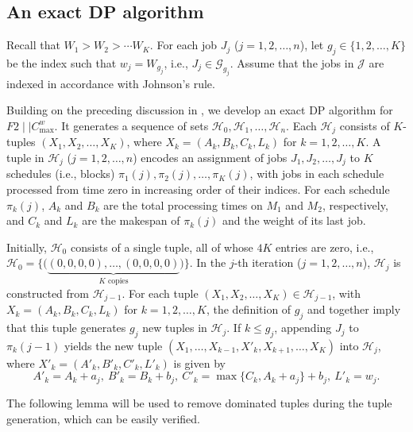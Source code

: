 \documentclass[12pt]{article} \textheight=24.5cm \textwidth=16.5cm \parskip = 0.165cm
\begin{document}
\begin{sloppypar}
        \subsection{An exact DP algorithm} \label{sec:dp}
        
        Recall that $W_1 >W_2 > \cdots W_K$.
        For each job $J_j$ ($j=1, 2, \ldots, n$), let $g_j \in \{1, 2, \ldots, K\}$ be the index such that $w_j=W_{g_j}$, i.e., $J_j\in\mathcal{G}_{g_j}$.
        Assume that the jobs in $\mathcal{J}$ are indexed in accordance with Johnson's rule.
        
        Building on the preceding discussion in , we develop an exact DP algorithm for $F2 \mid \mid C_{\max}^w$.
        It generates a sequence of sets $\mathcal{H}_0, \mathcal{H}_1, \ldots, \mathcal{H}_n$.
        Each $\mathcal{H}_j$ consists of $K$-tuples $(X_1, X_2, \ldots, X_K)$, where $X_k=(A_k, B_k, C_k, L_k)$ for $k=1, 2, \ldots, K$.
        A tuple in $\mathcal{H}_j$ ($j=1, 2, \ldots, n$) encodes an assignment of jobs $J_1, J_2, \ldots, J_j$ to $K$ schedules (i.e., blocks) $\pi_1(j), \pi_2(j), \ldots, \pi_K(j)$, with jobs in each schedule processed from time zero in increasing order of their indices.
        For each schedule $\pi_k(j)$, $A_k$ and $B_k$ are the total processing times on $M_1$ and $M_2$, respectively, and $C_k$ and $L_k$ are the makespan of $\pi_k(j)$ and the weight of its last job.
        
        Initially, $\mathcal{H}_0$ consists of a single tuple, all of whose $4K$ entries are zero, i.e., $\mathcal{H}_0=\{\Big (\underbrace{(0,0,0,0),\ldots,(0,0,0,0)}_{K\text{ copies}}\Big)\}$.
        In the $j$-th iteration ($j=1, 2, \ldots, n$), $\mathcal{H}_j$ is constructed from $\mathcal{H}_{j-1}$.
        For each tuple $(X_1, X_2, \ldots, X_K) \in \mathcal{H}_{j-1}$, with $X_k=(A_k, B_k, C_k, L_k)$ for $k=1, 2, \ldots, K$, the definition of $g_j$ and  together imply that this tuple generates $g_j$ new tuples in $\mathcal{H}_j$.
        If $k \leq g_j$, appending $J_j$ to $\pi_k(j-1)$ yields the new tuple $(X_1, \ldots, X_{k-1}, X'_k, X_{k+1}, \ldots, X_K)$ into $\mathcal{H}_j$, where $X'_k=(A'_k, B'_k, C'_k, L'_k)$ is given by
        \begin{equation} \label{eq-4.2: rec}
            A'_k=A_k+a_j, ~ B'_k=B_k+b_j, ~ C'_k=\max\{C_k, A_k + a_j \}+ b_j, ~ L'_k= w_j.
        \end{equation}
        
        The following lemma will be used to remove dominated tuples during the tuple generation, which can be easily verified.
        

\end{sloppypar}
\end{document}
